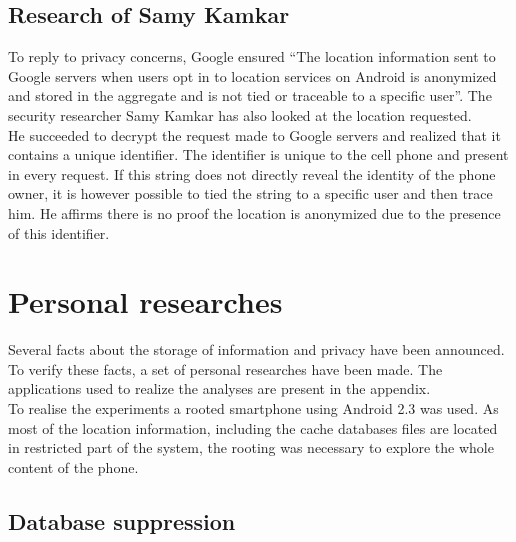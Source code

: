 \subsection{Research of Samy Kamkar}
\label{sec:andro-samy}

To reply to privacy concerns, Google ensured ``The location information sent to Google servers when users opt in to location services on Android is anonymized and stored in the aggregate and is not tied or traceable to a specific user''\cite{loc-not-traceable}.
The security researcher Samy Kamkar has also looked at the location requested.\\


He succeeded to decrypt the request made to Google servers and realized that it contains a unique identifier\cite{cnet-andr-samy}.
The identifier is unique to the cell phone and present in every request.
If this string does not directly reveal the identity of the phone owner, it is however possible to tied the string to a specific user and then trace him.
He affirms there is no proof the location is anonymized due to the presence of this identifier.\\

\section{Personal researches}
Several facts about the storage of information and privacy have been announced.
To verify these facts, a set of personal researches have been made.
The applications used to realize the analyses are present in the appendix.\\

To realise the experiments a rooted smartphone using Android 2.3 was used.
As most of the location information, including the cache databases files are located in restricted part of the system, the rooting was necessary to explore the whole content of the phone.

\subsection{Database suppression}

